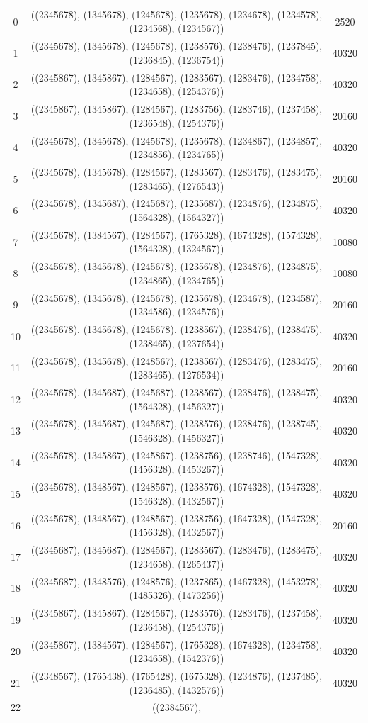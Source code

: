 \documentclass[pdftex]{sigma}
\theoremstyle{definition}
\numberwithin{equation}{section}
\begin{document}
\begin{center}
\begin{longtable}{|@{\,}c@{\,}|@{\,}c@{\,}|@{\,}c@{\,}|}
0 & ((2345678), (1345678), (1245678), (1235678), (1234678), (1234578), (1234568), (1234567)) & 2520 \\ 1 & ((2345678), (1345678), (1245678), (1238576), (1238476), (1237845), (1236845), (1236754)) & 40320 \\ 2 & ((2345867), (1345867), (1284567), (1283567), (1283476), (1234758), (1234658), (1254376)) & 40320 \\ 3 & ((2345867), (1345867), (1284567), (1283756), (1283746), (1237458), (1236548), (1254376)) & 20160 \\ 4 & ((2345678), (1345678), (1245678), (1235678), (1234867), (1234857), (1234856), (1234765)) & 40320 \\ 5 & ((2345678), (1345678), (1284567), (1283567), (1283476), (1283475), (1283465), (1276543)) & 20160 \\ 6 & ((2345678), (1345687), (1245687), (1235687), (1234876), (1234875), (1564328), (1564327)) & 40320 \\ 7 & ((2345678), (1384567), (1284567), (1765328), (1674328), (1574328), (1564328), (1324567)) & 10080 \\ 8 & ((2345678), (1345678), (1245678), (1235678), (1234876), (1234875), (1234865), (1234765)) & 10080 \\ 9 & ((2345678), (1345678), (1245678), (1235678), (1234678), (1234587), (1234586), (1234576)) & 20160 \\ 10 & ((2345678), (1345678), (1245678), (1238567), (1238476), (1238475), (1238465), (1237654)) & 40320 \\ 11 & ((2345678), (1345678), (1248567), (1238567), (1283476), (1283475), (1283465), (1276534)) & 20160 \\ 12 & ((2345678), (1345687), (1245687), (1238567), (1238476), (1238475), (1564328), (1456327)) & 40320 \\ 13 & ((2345678), (1345687), (1245687), (1238576), (1238476), (1238745), (1546328), (1456327)) & 40320 \\ 14 & ((2345678), (1345867), (1245867), (1238756), (1238746), (1547328), (1456328), (1453267)) & 40320 \\ 15 & ((2345678), (1348567), (1248567), (1238576), (1674328), (1547328), (1546328), (1432567)) & 40320 \\ 16 & ((2345678), (1348567), (1248567), (1238756), (1647328), (1547328), (1456328), (1432567)) & 20160 \\ 17 & ((2345687), (1345687), (1284567), (1283567), (1283476), (1283475), (1234658), (1265437)) & 40320 \\ 18 & ((2345687), (1348576), (1248576), (1237865), (1467328), (1453278), (1485326), (1473256)) & 40320 \\ 19 & ((2345867), (1345867), (1284567), (1283576), (1283476), (1237458), (1236458), (1254376)) & 40320 \\ 20 & ((2345867), (1384567), (1284567), (1765328), (1674328), (1234758), (1234658), (1542376)) & 40320 \\ 21 & ((2348567), (1765438), (1765428), (1675328), (1234876), (1237485), (1236485), (1432576)) & 40320 \\ 22 & ((2384567), 
\end{longtable}
\end{center}
\end{document}

